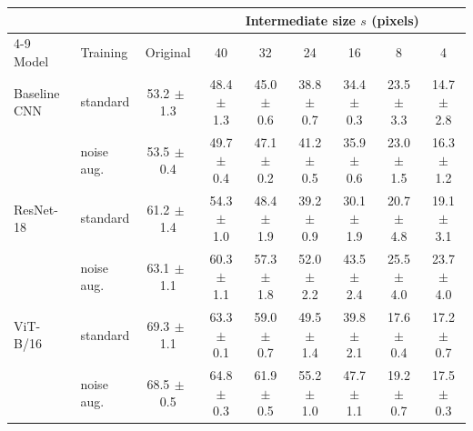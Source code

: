 \begin{tabular}{llccccccc}
\toprule
 & & & \multicolumn{6}{c}{Intermediate size $s$ (pixels)} \\
\cmidrule(lr){4-9}
Model & Training & Original & 40 & 32 & 24 & 16 & 8 & 4 \\
\midrule
Baseline CNN & standard & 53.2{\scriptsize$\,\pm\,$1.3} & 48.4{\scriptsize$\,\pm\,$1.3} & 45.0{\scriptsize$\,\pm\,$0.6} & 38.8{\scriptsize$\,\pm\,$0.7} & 34.4{\scriptsize$\,\pm\,$0.3} & 23.5{\scriptsize$\,\pm\,$3.3} & 14.7{\scriptsize$\,\pm\,$2.8} \\
 & noise aug. & 53.5{\scriptsize$\,\pm\,$0.4} & 49.7{\scriptsize$\,\pm\,$0.4} & 47.1{\scriptsize$\,\pm\,$0.2} & 41.2{\scriptsize$\,\pm\,$0.5} & 35.9{\scriptsize$\,\pm\,$0.6} & 23.0{\scriptsize$\,\pm\,$1.5} & 16.3{\scriptsize$\,\pm\,$1.2} \\
\addlinespace
ResNet-18 & standard & 61.2{\scriptsize$\,\pm\,$1.4} & 54.3{\scriptsize$\,\pm\,$1.0} & 48.4{\scriptsize$\,\pm\,$1.9} & 39.2{\scriptsize$\,\pm\,$0.9} & 30.1{\scriptsize$\,\pm\,$1.9} & 20.7{\scriptsize$\,\pm\,$4.8} & 19.1{\scriptsize$\,\pm\,$3.1} \\
 & noise aug. & 63.1{\scriptsize$\,\pm\,$1.1} & 60.3{\scriptsize$\,\pm\,$1.1} & 57.3{\scriptsize$\,\pm\,$1.8} & 52.0{\scriptsize$\,\pm\,$2.2} & 43.5{\scriptsize$\,\pm\,$2.4} & 25.5{\scriptsize$\,\pm\,$4.0} & 23.7{\scriptsize$\,\pm\,$4.0} \\
\addlinespace
ViT-B/16 & standard & 69.3{\scriptsize$\,\pm\,$1.1} & 63.3{\scriptsize$\,\pm\,$0.1} & 59.0{\scriptsize$\,\pm\,$0.7} & 49.5{\scriptsize$\,\pm\,$1.4} & 39.8{\scriptsize$\,\pm\,$2.1} & 17.6{\scriptsize$\,\pm\,$0.4} & 17.2{\scriptsize$\,\pm\,$0.7} \\
 & noise aug. & 68.5{\scriptsize$\,\pm\,$0.5} & 64.8{\scriptsize$\,\pm\,$0.3} & 61.9{\scriptsize$\,\pm\,$0.5} & 55.2{\scriptsize$\,\pm\,$1.0} & 47.7{\scriptsize$\,\pm\,$1.1} & 19.2{\scriptsize$\,\pm\,$0.7} & 17.5{\scriptsize$\,\pm\,$0.3} \\
\bottomrule
\end{tabular}
